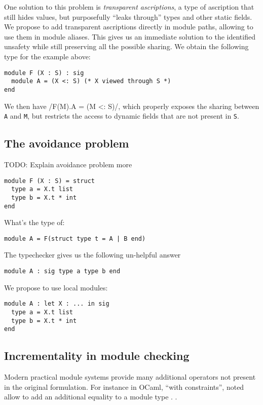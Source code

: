 One solution to this problem is \emph{transparent ascriptions}, a type of ascription
that still hides values, but purposefully ``leaks through'' types and other
static fields.
We propose to add transparent ascriptions directly in module paths, allowing
to use them in module aliases. This gives us an immediate
solution to the identified unsafety while still preserving all the possible sharing.
We obtain the following type for the example above:

\begin{verbatim}
module F (X : S) : sig
  module A = (X <: S) (* X viewed through S *)
end
\end{verbatim}

We then have \ocaml/F(M).A = (M <: S)/, which properly exposes the sharing
between {\tt A} and {\tt M}, but restricts the access to dynamic fields that are not
present in {\tt S}.

\subsection{The avoidance problem}

TODO: Explain avoidance problem more

\begin{verbatim}
module F (X : S) = struct
  type a = X.t list
  type b = X.t * int
end
\end{verbatim}

What's the type of:
\begin{verbatim}
module A = F(struct type t = A | B end)
\end{verbatim}

The typechecker gives us the following un-helpful answer
\begin{verbatim}
module A : sig type a type b end
\end{verbatim}

We propose to use local modules:

\begin{verbatim}
module A : let X : ... in sig
  type a = X.t list
  type b = X.t * int
end
\end{verbatim}

\subsection{Incrementality in module checking}

Modern practical module systems \cite{Rich calculus, etc} provide
many additional operators not present in the original formulation.
For instance in OCaml, ``with constraints'', noted 
allow to add an additional equality to a module type .
.

